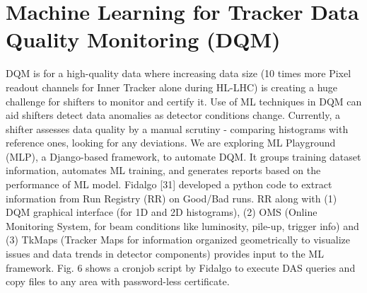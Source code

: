 \chapter{Machine Learning for Tracker Data Quality Monitoring (DQM) \label{ch:DQM}}
DQM is for a high-quality data where increasing data size (10 times more Pixel readout channels for Inner Tracker alone during HL-LHC) is creating a huge challenge for shifters to monitor and certify it.  Use of ML techniques in DQM can aid shifters detect data anomalies as detector conditions change. Currently, a shifter assesses data quality by a manual scrutiny - comparing histograms with reference ones, looking for any deviations.
We are exploring ML Playground (MLP), a Django-based framework, to automate DQM. It groups training dataset information, automates ML training, and generates reports based on the performance of ML model.
Fidalgo [31] developed a python code to extract information from Run Registry (RR) on Good/Bad runs. RR along with (1) DQM graphical interface (for 1D and 2D histograms), (2) OMS (Online Monitoring System, for beam conditions like luminosity, pile-up, trigger info) and (3) TkMaps (Tracker Maps for information organized geometrically to visualize issues and data trends in detector components) provides input to the ML framework. Fig. 6 shows a cronjob script by Fidalgo to execute DAS queries and copy files to any area with password-less certificate.


